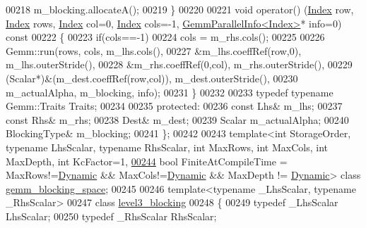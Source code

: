 \begin{DoxyCode}
00218     m\_blocking.allocateA();
00219   \}
00220 
00221   \textcolor{keywordtype}{void} operator() (\hyperlink{namespace_eigen_a62e77e0933482dafde8fe197d9a2cfde}{Index} row, \hyperlink{namespace_eigen_a62e77e0933482dafde8fe197d9a2cfde}{Index} rows, \hyperlink{namespace_eigen_a62e77e0933482dafde8fe197d9a2cfde}{Index} col=0, \hyperlink{namespace_eigen_a62e77e0933482dafde8fe197d9a2cfde}{Index} cols=-1, 
      \hyperlink{struct_eigen_1_1internal_1_1_gemm_parallel_info}{GemmParallelInfo<Index>}* info=0)\textcolor{keyword}{ const}
00222 \textcolor{keyword}{  }\{
00223     \textcolor{keywordflow}{if}(cols==-1)
00224       cols = m\_rhs.cols();
00225 
00226     Gemm::run(rows, cols, m\_lhs.cols(),
00227               &m\_lhs.coeffRef(row,0), m\_lhs.outerStride(),
00228               &m\_rhs.coeffRef(0,col), m\_rhs.outerStride(),
00229               (Scalar*)&(m\_dest.coeffRef(row,col)), m\_dest.outerStride(),
00230               m\_actualAlpha, m\_blocking, info);
00231   \}
00232 
00233   \textcolor{keyword}{typedef} \textcolor{keyword}{typename} Gemm::Traits Traits;
00234 
00235   \textcolor{keyword}{protected}:
00236     \textcolor{keyword}{const} Lhs& m\_lhs;
00237     \textcolor{keyword}{const} Rhs& m\_rhs;
00238     Dest& m\_dest;
00239     Scalar m\_actualAlpha;
00240     BlockingType& m\_blocking;
00241 \};
00242 
00243 \textcolor{keyword}{template}<\textcolor{keywordtype}{int} StorageOrder, \textcolor{keyword}{typename} LhsScalar, \textcolor{keyword}{typename} RhsScalar, \textcolor{keywordtype}{int} MaxRows, \textcolor{keywordtype}{int} MaxCols, \textcolor{keywordtype}{int} MaxDepth, \textcolor{keywordtype}{
      int} KcFactor=1,
\hyperlink{class_eigen_1_1internal_1_1gemm__blocking__space}{00244} \textcolor{keywordtype}{bool} FiniteAtCompileTime = MaxRows!=\hyperlink{namespace_eigen_ad81fa7195215a0ce30017dfac309f0b2}{Dynamic} && MaxCols!=\hyperlink{namespace_eigen_ad81fa7195215a0ce30017dfac309f0b2}{Dynamic} && MaxDepth != 
      \hyperlink{namespace_eigen_ad81fa7195215a0ce30017dfac309f0b2}{Dynamic}> \textcolor{keyword}{class }\hyperlink{class_eigen_1_1internal_1_1gemm__blocking__space}{gemm\_blocking\_space};
00245 
00246 \textcolor{keyword}{template}<\textcolor{keyword}{typename} \_LhsScalar, \textcolor{keyword}{typename} \_RhsScalar>
00247 \textcolor{keyword}{class }\hyperlink{class_eigen_1_1internal_1_1level3__blocking}{level3\_blocking}
00248 \{
00249     \textcolor{keyword}{typedef} \_LhsScalar LhsScalar;
00250     \textcolor{keyword}{typedef} \_RhsScalar RhsScalar;

\end{DoxyCode}
